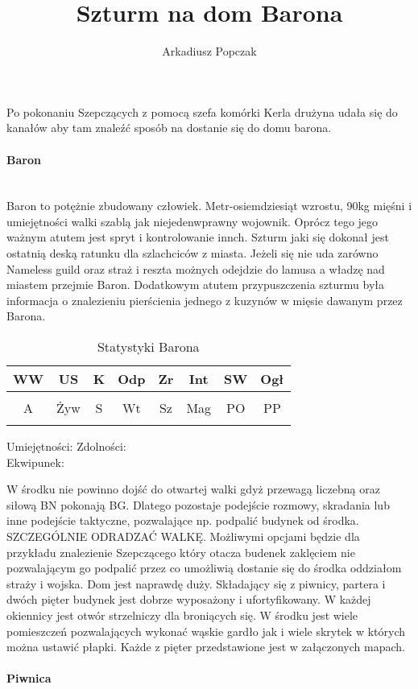 \documentclass{article}
\title{\Huge{Szturm na dom Barona}}
\author{Arkadiusz Popczak}
\newcommand{\whtable}[1]{
    \begin{table}[h]
        \caption{{#1}}
        \vspace{4pt}
        \centering
            \begin{tabular}{|c|c|c|c|c|c|c|c|}
                \hline
                WW & US & K & Odp & Zr & Int & SW & Ogł \\ \hline
                 &  &  &  &  &  &  &  \\ \hline
                A & Żyw & S & Wt & Sz & Mag & PO & PP \\ \hline
                 &  &  &  &  &  &  &  \\ \hline
                \end{tabular}
    \end{table}

    \noindent
    Umiejętności:
    \hspace{150pt}
    Zdolności:
    \vspace{50pt}\\
    Ekwipunek:
    \vspace{50pt}
}
\begin{document}
\maketitle

Po pokonaniu Szepczących z pomocą szefa komórki Kerla drużyna udała się do kanałów aby tam znaleźć sposób na dostanie się do domu barona. \\
\paragraph{\Large{Baron}}\mbox{}\\

\indent
Baron to potężnie zbudowany człowiek. Metr-osiemdziesiąt wzrostu, 90kg mięśni i umiejętności walki szablą jak niejedenwprawny wojownik. Oprócz tego jego ważnym atutem jest spryt i kontrolowanie innch. Szturm jaki się dokonał jest ostatnią deską ratunku dla szlachciców z miasta. Jeżeli się nie uda zarówno Nameless guild oraz straż i reszta możnych odejdzie do lamusa a władzę nad miastem przejmie Baron. Dodatkowym atutem przypuszczenia szturmu była informacja o znalezieniu pierścienia jednego z kuzynów w mięsie dawanym przez Barona.

\whtable{Statystyki Barona}

W środku nie powinno dojść do otwartej walki gdyż przewagą liczebną oraz siłową BN pokonają BG. Dlatego pozostaje podejście rozmowy, skradania lub inne podejście taktyczne, pozwalające np. podpalić budynek od środka. SZCZEGÓLNIE ODRADZAĆ WALKĘ. Możliwymi opcjami będzie dla przykładu znalezienie Szepczącego który otacza budenek zaklęciem nie pozwalającym go podpalić przez co umożliwią dostanie się do środka oddziałom straży i wojska. Dom jest naprawdę duży. Składający się z piwnicy, partera i dwóch pięter budynek jest dobrze wyposażony i ufortyfikowany. W każdej okiennicy jest otwór strzelniczy dla broniących się. W środku jest wiele pomieszczeń pozwalających wykonać wąskie gardło jak i wiele skrytek w których można ustawić płapki. Każde z pięter przedstawione jest w załączonych mapach. 

\paragraph{\Large{Piwnica}}\mbox{}\\
\end{document}

